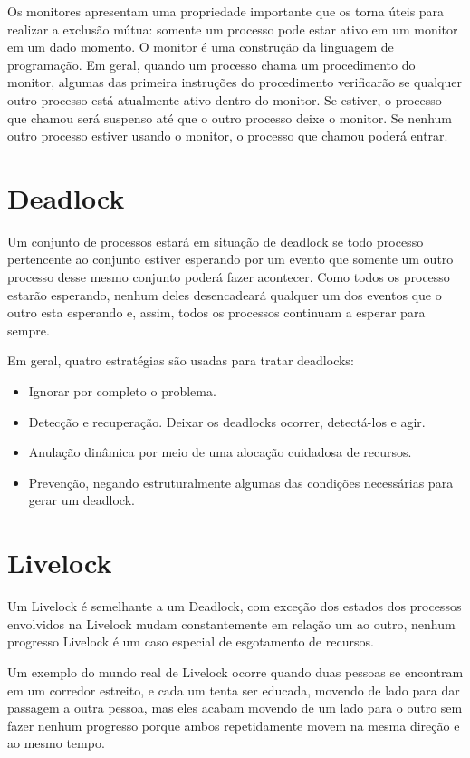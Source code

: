 Os monitores apresentam uma propriedade importante que os torna úteis para realizar a exclusão mútua: 
somente um processo pode estar ativo em um monitor em um dado momento. O monitor é uma construção da 
linguagem de programação. Em geral, quando um processo chama um procedimento do monitor, algumas das 
primeira instruções do procedimento verificarão  se qualquer outro processo está atualmente ativo 
dentro do monitor. Se estiver, o processo que chamou será suspenso até que o outro processo deixe o 
monitor. Se nenhum outro processo estiver usando o monitor, o processo que chamou poderá entrar.

\section{Deadlock}

Um conjunto de processos estará em situação de deadlock se todo processo pertencente ao conjunto 
estiver esperando por um evento que somente um outro processo desse mesmo conjunto poderá fazer 
acontecer. Como todos os processo estarão esperando, nenhum deles desencadeará qualquer um dos 
eventos que o outro esta esperando e, assim, todos os processos continuam a esperar para sempre.

Em geral, quatro estratégias são usadas para tratar deadlocks:

\begin{itemize}
\item Ignorar por completo o problema.
\item Detecção e recuperação. Deixar os deadlocks ocorrer, detectá-los e agir.
\item Anulação dinâmica por meio de uma alocação cuidadosa de recursos.
\item Prevenção, negando estruturalmente algumas das condições necessárias para gerar um deadlock.
\end{itemize}

\section{Livelock}

Um Livelock é semelhante a um Deadlock, com exceção dos estados dos processos envolvidos na 
Livelock mudam constantemente em relação um ao outro, nenhum progresso Livelock é um caso 
especial de esgotamento de recursos.

Um exemplo do mundo real de Livelock ocorre quando duas pessoas se encontram em um corredor 
estreito, e cada um tenta ser educada, movendo de lado para  dar passagem a outra pessoa, 
mas eles acabam movendo de um lado para o outro sem fazer nenhum progresso porque ambos 
repetidamente movem na mesma direção e ao mesmo tempo.


